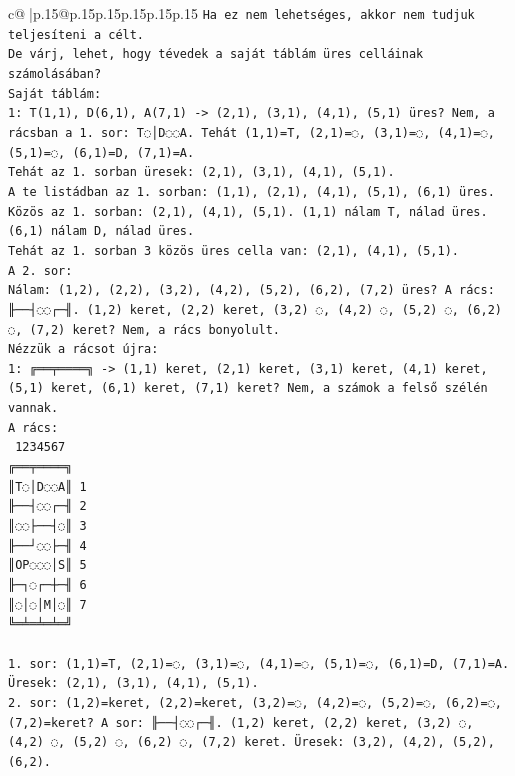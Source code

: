 \documentclass{article}
\begin{document}
{\begin{supertabular}{c@{$\;$}|p{.15\linewidth}@{}p{.15\linewidth}p{.15\linewidth}p{.15\linewidth}p{.15\linewidth}p{.15\linewidth}}
{{{\texttt{Ha ez nem lehetséges, akkor nem tudjuk teljesíteni a célt.} \\
\texttt{De várj, lehet, hogy tévedek a saját táblám üres celláinak számolásában?} \\
\texttt{Saját táblám:} \\
\texttt{1: T(1,1), D(6,1), A(7,1) {-}> (2,1), (3,1), (4,1), (5,1) üres? Nem, a rácsban a 1. sor: T◌│D◌◌A. Tehát (1,1)=T, (2,1)=◌, (3,1)=◌, (4,1)=◌, (5,1)=◌, (6,1)=D, (7,1)=A.} \\
\texttt{Tehát az 1. sorban üresek: (2,1), (3,1), (4,1), (5,1).} \\
\texttt{A te listádban az 1. sorban: (1,1), (2,1), (4,1), (5,1), (6,1) üres.} \\
\texttt{Közös az 1. sorban: (2,1), (4,1), (5,1). (1,1) nálam T, nálad üres. (6,1) nálam D, nálad üres.} \\
\texttt{Tehát az 1. sorban 3 közös üres cella van: (2,1), (4,1), (5,1).} \\
\texttt{A 2. sor:} \\
\texttt{Nálam: (1,2), (2,2), (3,2), (4,2), (5,2), (6,2), (7,2) üres? A rács: ╟──┤◌◌┌─╢. (1,2) keret, (2,2) keret, (3,2) ◌, (4,2) ◌, (5,2) ◌, (6,2) ◌, (7,2) keret? Nem, a rács bonyolult.} \\
\texttt{Nézzük a rácsot újra:} \\
\texttt{1: ╔══╤════╗ {-}> (1,1) keret, (2,1) keret, (3,1) keret, (4,1) keret, (5,1) keret, (6,1) keret, (7,1) keret? Nem, a számok a felső szélén vannak.} \\
\texttt{A rács:} \\
\texttt{ 1234567} \\
\texttt{╔══╤════╗} \\
\texttt{║T◌│D◌◌A║ 1} \\
\texttt{╟──┤◌◌┌─╢ 2} \\
\texttt{║◌◌├──┤◌║ 3} \\
\texttt{╟──┘◌◌├─╢ 4} \\
\texttt{║OP◌◌◌│S║ 5} \\
\texttt{╟─┐◌┌─┼─╢ 6} \\
\texttt{║◌│◌│M│◌║ 7} \\
\texttt{╚═╧═╧═╧═╝} \\
\\ 
\texttt{1. sor: (1,1)=T, (2,1)=◌, (3,1)=◌, (4,1)=◌, (5,1)=◌, (6,1)=D, (7,1)=A. Üresek: (2,1), (3,1), (4,1), (5,1).} \\
\texttt{2. sor: (1,2)=keret, (2,2)=keret, (3,2)=◌, (4,2)=◌, (5,2)=◌, (6,2)=◌, (7,2)=keret? A sor: ╟──┤◌◌┌─╢. (1,2) keret, (2,2) keret, (3,2) ◌, (4,2) ◌, (5,2) ◌, (6,2) ◌, (7,2) keret. Üresek: (3,2), (4,2), (5,2), (6,2).} \\
}}}
\end{supertabular}}
\end{document}
